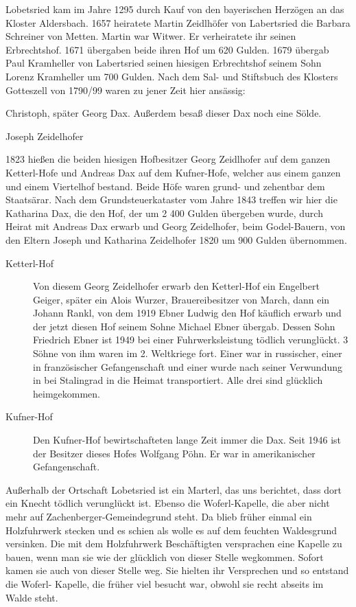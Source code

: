 \documentclass{book}
\begin{document}
Lobetsried kam im Jahre 1295 durch Kauf von den bayerischen Herzögen an
das Kloster Aldersbach. 1657 heiratete Martin Zeidlhöfer von Labertsried
die Barbara Schreiner von Metten. Martin war Witwer. Er verheiratete ihr
seinen Erbrechtshof. 1671 übergaben beide ihren Hof um 620 Gulden. 1679
übergab Paul Kramheller von Labertsried seinen hiesigen Erbrechtshof
seinem Sohn Lorenz Kramheller um 700 Gulden. Nach dem Sal- und
Stiftsbuch des Klosters Gotteszell von 1790/99 waren zu jener Zeit hier
ansässig:

\begin{compactitem}
\item Christoph, später Georg Dax. Außerdem besaß dieser Dax noch eine
Sölde.
\item Joseph Zeidelhofer
\end{compactitem}

1823 hießen die beiden hiesigen Hofbesitzer Georg Zeidlhofer auf dem
ganzen Ketterl-Hofe und Andreas Dax auf dem Kufner-Hofe, welcher aus
einem ganzen und einem Viertelhof bestand. Beide Höfe waren grund- und
zehentbar dem Staatsärar. Nach dem Grundsteuerkataster vom Jahre 1843
treffen wir hier die Katharina Dax, die den Hof, der um 2 400 Gulden
übergeben wurde, durch Heirat mit Andreas Dax erwarb und Georg
Zeidelhofer, beim Godel-Bauern, von den Eltern Joseph und Katharina
Zeidelhofer 1820 um 900 Gulden übernommen.

\begin{description}
\item[Ketterl-Hof] Von diesem Georg Zeidelhofer erwarb den Ketterl-Hof
ein Engelbert Geiger, später ein Alois Wurzer, Brauereibesitzer von
March, dann ein Johann Rankl, von dem 1919 Ebner Ludwig den Hof käuflich
erwarb und der jetzt diesen Hof seinem Sohne Michael Ebner übergab.
Dessen Sohn Friedrich Ebner ist 1949 bei einer Fuhrwerksleistung tödlich
verunglückt. 3 Söhne von ihm waren im 2. Weltkriege fort. Einer war in
russischer, einer in französischer Gefangenschaft und einer wurde nach
seiner Verwundung in bei Stalingrad in die Heimat transportiert. Alle
drei sind glücklich heimgekommen.

\item[Kufner-Hof] Den Kufner-Hof bewirtschafteten lange Zeit immer die
Dax. Seit 1946 ist der Besitzer dieses Hofes Wolfgang Pöhn. Er war in
amerikanischer Gefangenschaft.
\end{description}

Außerhalb der Ortschaft Lobetsried ist ein Marterl, das uns berichtet,
dass dort ein Knecht tödlich verunglückt ist. Ebenso die Woferl-Kapelle,
die aber nicht mehr auf Zachenberger-Gemeindegrund steht. Da blieb
früher einmal ein Holzfuhrwerk stecken und es schien als wolle es auf
dem feuchten Waldesgrund versinken. Die mit dem Holzfuhrwerk
Beschäftigten versprachen eine Kapelle zu bauen, wenn man sie wie der
glücklich von dieser Stelle wegkommen. Sofort kamen sie auch von dieser
Stelle weg. Sie hielten ihr Versprechen und so entstand die Woferl-
Kapelle, die früher viel besucht war, obwohl sie recht abseits im Walde
steht.
\end{document}
